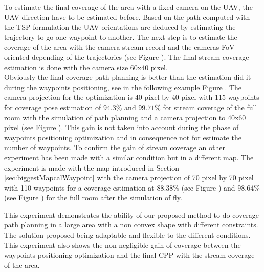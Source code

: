 To estimate the final coverage of the area with a fixed camera on the UAV, the UAV direction have to be estimated before. 
Based on the path computed with the TSP formulation the UAV orientations are deduced by estimating the trajectory to go one waypoint to another.
The next step is to estimate the coverage of the area with the camera stream  record and the cameras FoV oriented depending of the trajectories (see Figure ). The final stream coverage estimation is done with the camera size 60x40 pixel. \\
Obviously the final coverage path planning is better than the estimation did it during the waypoints positioning, see  in the following example Figure . The camera projection for the optimization  is 40 pixel by 40 pixel with 115 waypoints for coverage pose estimation of $94.3\%$ and $99.71\%$ for stream coverage of the full room with the simulation of path planning and a camera projection to 40x60 pixel (see Figure ). This gain is not taken into account during the phase of waypoints positioning optimization and in consequence not for estimate the number of waypoints.%
To confirm the gain of stream coverage an other experiment has been made with a similar condition but in a different map. The experiment is made with the map introduced in Section \ref{sec:biggestMapcalWaypoint} with the camera projection of 70 pixel by 70 pixel with 110 waypoints for a coverage estimation at 88.38\%  (see Figure ) and 98.64\% (see Figure ) for the full room after the simulation of fly.

This experiment demonstrates the ability of our proposed method to do coverage path planning in a large area with a non convex shape with different constraints. The solution proposed being adaptable and flexible to the different conditions. This experiment also shows the non negligible gain of coverage between the waypoints positioning optimization and the final CPP with the stream coverage of the area.




